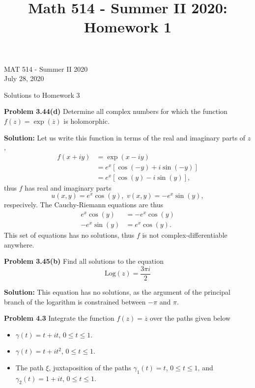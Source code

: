 \documentclass[12pt,oneside]{exam}
\title{Math 514 - Summer II 2020: Homework 1}
\newenvironment{exercise}[1]{\vspace{.1in}\noindent\textbf{Problem #1 \hspace{.05em}}}{}
\begin{document}
\begin{flushright}
\sc MAT 514 - Summer II 2020\\
July 28, 2020
\end{flushright}
\bigskip
 
\begin{center}
\textsf{Solutions to Homework 3} 
\end{center}


\begin{exercise}{3.44(d)}
Determine all complex numbers for which the function $f(z)=\exp(\overline{z})$ is holomorphic.
\end{exercise}

\vspace{0.5cm}

\noindent \textbf{Solution:} Let us write this function in terms of the real and imaginary parts of $z$, 
\begin{align*}
f(x+iy) & = \exp(x-iy) \\
& = e^{x}[\cos(-y)+i\sin(-y)]\\
& = e^{x}[\cos(y)-i\sin(y)],
\end{align*}
thus $f$ has real and imaginary parts 
\begin{equation*}
u(x,y)=e^{x}\cos(y), \, \, v(x,y) = -e^{x}\sin(y),
\end{equation*}
respecively. The Cauchy-Riemann equations are thus
\begin{align*}
e^{x}\cos(y) & = -e^{x}\cos(y) \\
-e^{x}\sin(y) & = e^{x}\cos(y).
\end{align*}
This set of equations has no solutions, thus $f$ is not complex-differentiable anywhere. 

\vspace{1cm}

\begin{exercise}{3.45(b)}
Find all solutions to the equation 
\begin{equation*}
\mathrm{Log}(z)=\frac{3\pi i}{2}
\end{equation*}
\end{exercise}

\vspace{0.5cm}
\noindent \textbf{Solution:} This equation has no solutions, as the argument of the principal branch of the logarithm is constrained between $-\pi$ and $\pi$. 
\vspace{1cm}

\begin{exercise}{4.3}
Integrate the function $f(z)=\overline{z}$ over the paths given below
\begin{itemize}
\item[(a)] $\gamma(t) = t+it$, $0\leq t \leq 1$. 
\item[(b)] $\gamma(t) = t + it^2$, $0 \leq t \leq 1$. 
\item[(c)] The path $\xi$, juxtaposition of the paths $\gamma_1(t) =t$, $0\leq t \leq 1$, and $\gamma_2(t) = 1+it$, $0 \leq t \leq 1$. 
\end{itemize}
\end{exercise}
\end{document}
